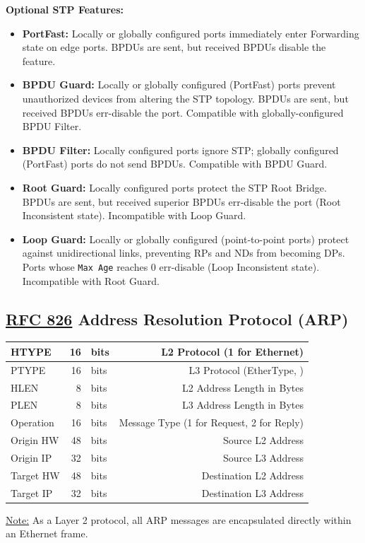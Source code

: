 \documentclass[12pt]{article}
\newif\ifcolor											%
\newcommand{\note}[1]{\ifcolor \colorbox{#1}{Note:}\else \underline{Note:}\fi}
\newcommand{\RFC}[1]{\href{https://datatracker.ietf.org/doc/html/rfc#1}{RFC #1}}
\begin{document}
	\textbf{Optional STP Features:}
	\begin{itemize}[leftmargin=*,label=]
		\label{itm:STP FEATURES}
		\item{\textbf{PortFast:} Locally or globally configured ports immediately enter Forwarding state on edge ports. BPDUs are sent, but received BPDUs disable the feature.}
		\item{\textbf{BPDU Guard:} Locally or globally configured (PortFast) ports prevent unauthorized devices from altering the STP topology. BPDUs are sent, but received BPDUs err-disable the port. Compatible with globally-configured BPDU Filter.}
		\item{\textbf{BPDU Filter:} Locally configured ports ignore STP; globally configured (PortFast) ports do not send BPDUs. Compatible with BPDU Guard.}
		\item{\textbf{Root Guard:} Locally configured ports protect the STP Root Bridge. BPDUs are sent, but received superior BPDUs err-disable the port (Root Inconsistent state). Incompatible with Loop Guard.}
		\item{\textbf{Loop Guard:} Locally or globally configured (point-to-point ports) protect against unidirectional links, preventing RPs and NDs from becoming DPs. Ports whose \texttt{Max Age} reaches 0 err-disable (Loop Inconsistent state). Incompatible with Root Guard.}
	\end{itemize}


	\subsection[RFC 826 ARP]{\RFC{826} Address Resolution Protocol (ARP) \label{subsec:ARP}}
	\begin{table}[H]
	\centering
	\begin{tabular}{| l | r @{ } l | r |}\hline
	HTYPE	& 16	& bits	& L2 Protocol (1 for Ethernet)\\\hline
	PTYPE	& 16	& bits	& L3 Protocol (EtherType, \Cref{tab:ETHERTYPE})\\\hline
	HLEN		& 8	& bits	& L2 Address Length in Bytes\\\hline
	PLEN		& 8	& bits	& L3 Address Length in Bytes\\\hline
	Operation	& 16	& bits	& Message Type (1 for Request, 2 for Reply)\\\hline
	Origin HW 	& 48	& bits	& Source L2 Address\\\hline
	Origin IP	& 32	& bits	& Source L3 Address\\\hline
	Target HW 	& 48	& bits	& Destination L2 Address\\\hline
	Target IP	& 32	& bits	& Destination L3 Address\\\hline
	\end{tabular}\end{table}
	\note{Goldenrod} As a Layer 2 protocol, all ARP messages are encapsulated directly within an Ethernet frame.
\end{document}
